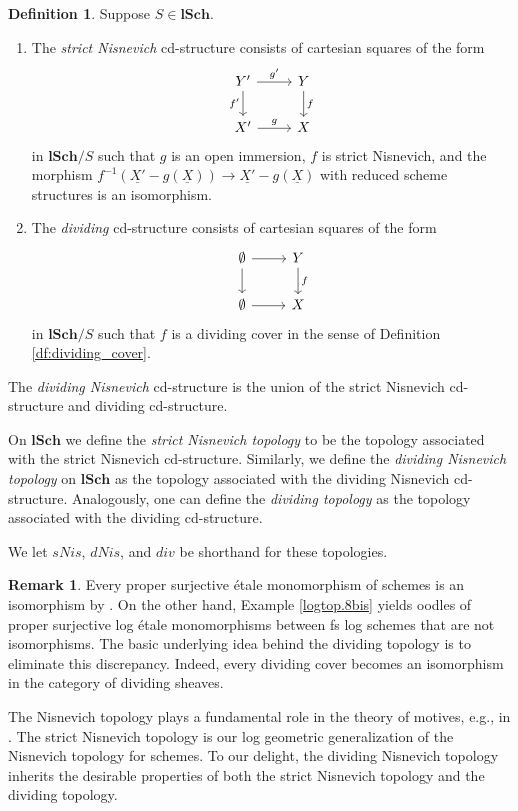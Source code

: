 \documentclass[11pt, a4paper]{amsart}
\theoremstyle{definition}
\newtheorem{df}[thm]{Definition}
\newtheorem{rmk}[thm]{Remark}
\numberwithin{equation}{subsection}
\newcommand{\lSch}{\mathbf{lSch}}
\renewcommand{\ul}{\underline}
\begin{document}
\begin{df}
\label{logtop.2}
Suppose $S\in \lSch$.
\begin{enumerate}
\item[(1)]
The \emph{strict Nisnevich} cd-structure consists of cartesian squares of the form
\[
\begin{tikzcd}
Y'\ar[r,"g'"]\ar[d,"f'"']&
Y\ar[d,"f"]
\\
X'\ar[r,"g"]&
X
\end{tikzcd}
\]
in $\lSch/S$ such that $g$ is an open immersion, $f$ is strict Nisnevich, and the morphism $f^{-1}(\ul{X'}-g(\ul{X}))\to \ul{X'}-g(\ul{X})$ with reduced scheme structures is an isomorphism.
\item[(2)]
The \emph{dividing} cd-structure  consists of cartesian squares of the form
\[
\begin{tikzcd}
\emptyset\ar[d]\ar[r]&
Y\ar[d,"f"]
\\
\emptyset\ar[r]&
X
\end{tikzcd}
\]
in $\lSch/S$ such that $f$ is a dividing cover in the sense of Definition \ref{df:dividing_cover}.
\end{enumerate}
The \emph{dividing Nisnevich} cd-structure  
is the union of the strict Nisnevich cd-structure and dividing cd-structure.

On $\lSch$ we define the \emph{strict Nisnevich topology} to be the topology associated with the strict Nisnevich cd-structure. Similarly, we define the \emph{dividing Nisnevich topology} on $\lSch$ as the topology associated with the dividing Nisnevich cd-structure.
Analogously, one can define the \emph{dividing topology} as the topology associated with the dividing cd-structure.

We let $sNis$, $dNis$, and $div$ be shorthand for these 
topologies.
\end{df}

\begin{rmk}
Every proper surjective \'etale monomorphism of schemes is an isomorphism by \cite[Th\'eor\`eme IV.17.9.1]{EGA}.
On the other hand, 
Example \ref{logtop.8bis} yields oodles of 
proper surjective log  \'etale monomorphisms between fs log schemes that are not isomorphisms. 
The basic underlying idea behind the dividing topology is to eliminate this discrepancy. 
Indeed, 
every dividing cover becomes an isomorphism in the category of dividing sheaves. 

The Nisnevich topology plays a fundamental role in the theory of motives, e.g., in \cite{MV}.
The strict Nisnevich topology is our log geometric generalization of the Nisnevich topology for schemes.
To our delight, 
the dividing Nisnevich topology inherits the desirable properties of both the strict Nisnevich topology 
and the dividing topology.
\end{rmk}
\end{document}
